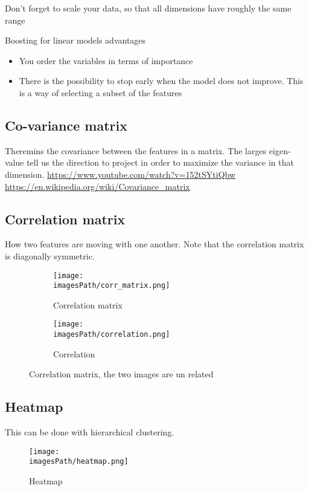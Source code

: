 Don’t forget to scale your data, so that all dimensions have roughly the
same range

Boosting for linear models advantages
\begin{itemize}
    \item You order the variables in terms of importance
    \item There is the possibility to stop early when the model does not
improve. This is a way of selecting a subset of the features
\end{itemize}

\subsection{Co-variance matrix}
Theremins the covariance between the features in a matrix. 
The larges eigen-value tell us the direction to project in order to 
maximize the variance in that dimension.
\url{https://www.youtube.com/watch?v=152tSYtiQbw}
\url{https://en.wikipedia.org/wiki/Covariance_matrix}


\subsection{Correlation matrix}
How two features are moving with one another. Note that the correlation matrix is diagonally symmetric.
\begin{figure}[!h]
     \centering
     \begin{subfigure}[b]{0.35\textwidth}
         \centering
         \texttt{[image: \\imagesPath/corr\_matrix.png]}
         \caption{Correlation matrix}
     \end{subfigure}
     \hfill
     \begin{subfigure}[b]{0.55\textwidth}
         \centering
         \texttt{[image: \\imagesPath/correlation.png]}
         \caption{Correlation}
     \end{subfigure}
    \caption{Correlation matrix, the two images are un related}
\end{figure}


\subsection{Heatmap}
This can be done with hierarchical clustering.
\begin{figure}[!h]
    \centering
    \texttt{[image: \\imagesPath/heatmap.png]}
    \caption{Heatmap}
\end{figure}


